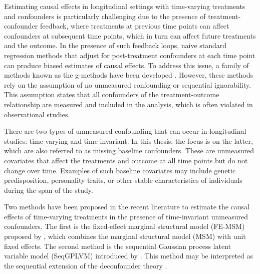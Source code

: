 Estimating causal effects in longitudinal settings with time-varying treatments and confounders is 
particularly challenging due to the presence of treatment-confounder feedback, where treatments at 
previous time points can affect confounders at subsequent time points, which in turn can affect future 
treatments and the outcome. In the presence of such feedback loops, naive standard regression methods that 
adjust for 
post-treatment confounders at each time point can produce biased estimates of causal effects. %
To address this issue, a family of methods known as the g-methods have been developed \cite{robinsEstimationCausalEffects2008a, naimiIntroductionMethods2017}. 
However, these methods rely on the assumption of no unmeasured confounding or sequential ignorability. This assumption states 
that all confounders of the treatment-outcome relationship are measured and included in the analysis,
which is often violated in observational studies.

There are two types of unmeasured confounding that can occur in longitudinal 
studies: time-varying and time-invariant. In this thesis, the focus is on the latter, 
which are also referred to as missing baseline confounders. These are 
unmeasured covariates that affect the treatments and outcome at all time 
points but do not change over time. Examples of such baseline covariates may 
include genetic predisposition, personality traits, or other stable 
characteristics of individuals during the span of the study. 

Two methods have been proposed in the recent literature to estimate the 
causal effects of time-varying treatments in the presence of time-invariant 
unmeasured confounders. The first is the fixed-effect marginal structural model (FE-MSM) 
proposed by , 
which combines the marginal structural model (MSM) 
\cite{robinsMarginalStructuralModels2000} with unit fixed effects. The second method 
is the sequential Gaussian process latent variable model (SeqGPLVM) introduced by 
. This method may be interpreted as the 
sequential extension of the deconfounder theory \cite{wangBlessingsMultipleCauses2019}.


